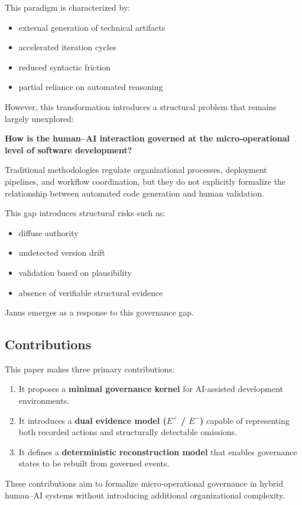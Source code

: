 \documentclass[conference]{IEEEtran}
\begin{document}
This paradigm is characterized by:
\begin{itemize}
  \item external generation of technical artifacts
  \item accelerated iteration cycles
  \item reduced syntactic friction
  \item partial reliance on automated reasoning
\end{itemize}

However, this transformation introduces a structural problem that remains largely unexplored:

\textbf{How is the human--AI interaction governed at the micro-operational level of software development?}

Traditional methodologies regulate organizational processes, deployment pipelines, and workflow coordination, but they do not explicitly formalize the relationship between automated code generation and human validation.

This gap introduces structural risks such as:
\begin{itemize}
  \item diffuse authority
  \item undetected version drift
  \item validation based on plausibility
  \item absence of verifiable structural evidence
\end{itemize}

Janus emerges as a response to this governance gap.

\subsection{Contributions}
This paper makes three primary contributions:
\begin{enumerate}
  \item It proposes a \textbf{minimal governance kernel} for AI-assisted development environments.
  \item It introduces a \textbf{dual evidence model ($E^{+}$ / $E^{-}$)} capable of representing both recorded actions and structurally detectable omissions.
  \item It defines a \textbf{deterministic reconstruction model} that enables governance states to be rebuilt from governed events.
\end{enumerate}

These contributions aim to formalize micro-operational governance in hybrid human--AI systems without introducing additional organizational complexity.
\end{document}
